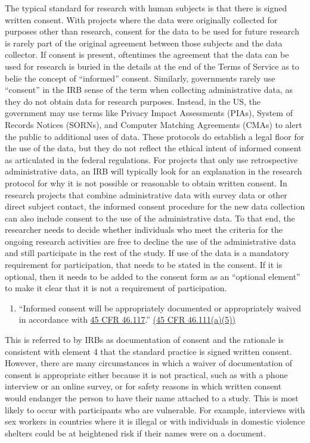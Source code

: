 The typical standard for research with human subjects is that there is signed written consent. With projects where the data were originally collected for purposes other than research, consent for the data to be used for future research is rarely part of the original agreement between those subjects and the data collector. If consent is present, oftentimes the agreement that the data can be used for research is buried in the details at the end of the Terms of Service as to belie the concept of ``informed'' consent. Similarly, governments rarely use ``consent'' in the IRB sense of the term when collecting administrative data, as they do not obtain data for research purposes. Instead, in the US, the government may use terms like Privacy Impact Assessments (PIAs), System of Records Notices (SORNs), and Computer Matching Agreements (CMAs) to alert the public to additional uses of data. These protocols do establish a legal floor for the use of the data, but they do not reflect the ethical intent of informed consent as articulated in the federal regulations. For projects that only use retrospective administrative data, an IRB will typically look for an explanation in the research protocol for why it is not possible or reasonable to obtain written consent. In research projects that combine administrative data with survey data or other direct subject contact, the informed consent procedure for the new data collection can also include consent to the use of the administrative data. To that end, the researcher needs to decide whether individuals who meet the criteria for the ongoing research activities are free to decline the use of the administrative data and still participate in the rest of the study. If use of the data is a mandatory requirement for participation, that needs to be stated in the consent. If it is optional, then it needs to be added to the consent form as an ``optional element'' to make it clear that it is not a requirement of participation.

\begin{enumerate}
\def\labelenumi{(\arabic{enumi})}
\setcounter{enumi}{4}
\tightlist
\item
  ``Informed consent will be appropriately documented or appropriately waived in accordance with \href{https://www.law.cornell.edu/cfr/text/45/46.117}{45 CFR 46.117}.'' \href{https://www.law.cornell.edu/cfr/text/45/46.111}{(45 CFR 46.111(a)(5))}
\end{enumerate}

This is referred to by IRBs as documentation of consent and the rationale is consistent with element 4 that the standard practice is signed written consent. However, there are many circumstances in which a waiver of documentation of consent is appropriate either because it is not practical, such as with a phone interview or an online survey, or for safety reasons in which written consent would endanger the person to have their name attached to a study. This is most likely to occur with participants who are vulnerable. For example, interviews with sex workers in countries where it is illegal or with individuals in domestic violence shelters could be at heightened risk if their names were on a document.

